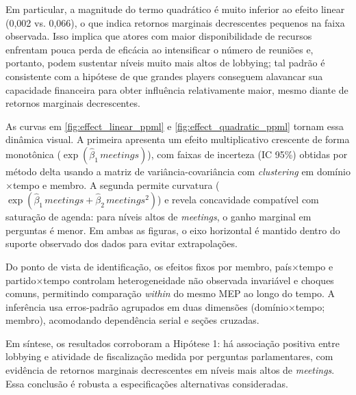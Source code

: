 Em particular, a magnitude do termo quadrático é muito inferior ao efeito linear (0,002 vs. 0,066), o que indica retornos marginais decrescentes pequenos na faixa observada. Isso implica que atores com maior disponibilidade de recursos enfrentam pouca perda de eficácia ao intensificar o número de reuniões e, portanto, podem sustentar níveis muito mais altos de lobbying; tal padrão é consistente com a hipótese de que grandes players conseguem alavancar sua capacidade financeira para obter influência relativamente maior, mesmo diante de retornos marginais decrescentes.

As curvas em \autoref{fig:effect_linear_ppml} e \autoref{fig:effect_quadratic_ppml} tornam essa dinâmica visual. A primeira apresenta um efeito multiplicativo crescente de forma monotônica (\(\exp(\hat{\beta}_1\,\textit{meetings})\)), com faixas de incerteza (IC 95\%) obtidas por método delta usando a matriz de variância-covariância com \textit{clustering} em domínio$\times$tempo e membro. A segunda permite curvatura (\(\exp(\hat{\beta}_1\,\textit{meetings}+\hat{\beta}_2\,\textit{meetings}^2)\)) e revela concavidade compatível com saturação de agenda: para níveis altos de \textit{meetings}, o ganho marginal em perguntas é menor. Em ambas as figuras, o eixo horizontal é mantido dentro do suporte observado dos dados para evitar extrapolações.

Do ponto de vista de identificação, os efeitos fixos por membro, país$\times$tempo e partido$\times$tempo controlam heterogeneidade não observada invariável e choques comuns, permitindo comparação \textit{within} do mesmo MEP ao longo do tempo. A inferência usa erros-padrão agrupados em duas dimensões (domínio$\times$tempo; membro), acomodando dependência serial e seções cruzadas.

Em síntese, os resultados corroboram a Hipótese 1: há associação positiva entre lobbying e atividade de fiscalização medida por perguntas parlamentares, com evidência de retornos marginais decrescentes em níveis mais altos de \textit{meetings}. Essa conclusão é robusta a especificações alternativas consideradas.